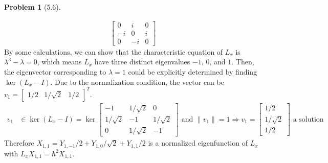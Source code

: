 \documentclass[twoside,11pt]{article}
\theoremstyle{definition}
\newtheorem{problem}{Problem}
\theoremstyle{remark}
\begin{document}
\begin{problem}[5.6]
\begin{enumerate}[label=(\alph*)]
\begin{align*}
\begin{bmatrix}
                0 & i & 0\\
                -i & 0 & i\\
                0 & -i & 0
            \end{bmatrix}
        \end{align*}
        By some calculations, we can show that the characteristic equation of
        $L_x$ is $\lambda^3 - \lambda=0$, which means $L_x$ have three distinct
        eigenvalues $-1$, $0$, and $1$.
        Then, the eigenvector corresponding to $\lambda=1$ could be explicitly determined by
        finding $\ker (L_x - I)$. Due to the normalization condition, the vector can
        be $v_1 = \begin{bmatrix} 1/2 & 1/\sqrt{2} & 1/2\end{bmatrix}^T$.
        \begin{align*}
            v_1&\in\ker (L_x-I) = \ker\begin{bmatrix}
                -1 & 1/\sqrt{2} & 0\\
                1/\sqrt{2} & -1 & 1/\sqrt{2}\\
                0 & 1/\sqrt{2} & -1
            \end{bmatrix}  \text{ and } \|v_1\| = 1
            \Rightarrow v_1 = \begin{bmatrix}
                1/2 \\ 1/\sqrt{2} \\ 1/2
            \end{bmatrix} \text{ a solution}
        \end{align*}
        Therefore $X_{1,1} = Y_{1,-1}/2 + Y_{1,0}/\sqrt{2} + Y_{1,1}/2$ is a normalized eigenfunction
        of $L_x$ with $L_x X_{1,1} = \hbar^2 X_{1,1}$.
    \end{enumerate}
\end{problem}
\end{document}
